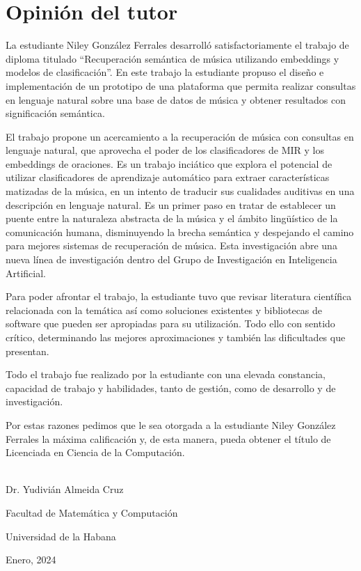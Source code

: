 \chapter*{Opinión del tutor}
\small
La estudiante Niley González Ferrales desarrolló satisfactoriamente el trabajo de diploma titulado “Recuperación semántica de música utilizando embeddings y modelos de clasificación”. En este trabajo la estudiante propuso el diseño e implementación de un prototipo de una plataforma que permita realizar consultas en lenguaje natural sobre una base de datos de música y obtener resultados con significación semántica.

El trabajo propone un acercamiento a la recuperación de música con consultas en lenguaje natural, que aprovecha el poder de los clasificadores de MIR y los embeddings de oraciones. Es un trabajo inciático que explora el potencial de utilizar clasificadores de aprendizaje automático para extraer características matizadas de la música, en un intento de traducir sus cualidades auditivas en una descripción en lenguaje natural. Es un primer paso en tratar de establecer un puente entre la naturaleza abstracta de la música y el ámbito lingüístico de la comunicación humana, disminuyendo la brecha semántica y despejando el camino para mejores sistemas de recuperación de música. Esta investigación abre una nueva línea de investigación dentro del Grupo de Investigación en Inteligencia Artificial.

Para poder afrontar el trabajo, la estudiante tuvo que revisar literatura científica relacionada con la temática así como soluciones existentes y bibliotecas de software que pueden ser apropiadas para su utilización. Todo ello con sentido crítico, determinando las mejores aproximaciones y también las dificultades que presentan.

Todo el trabajo fue realizado por la estudiante con una elevada constancia, capacidad de trabajo y habilidades, tanto de gestión, como de desarrollo y de investigación. 

Por estas razones pedimos que le sea otorgada a la estudiante Niley González Ferrales la máxima calificación y, de esta manera, pueda obtener el título de Licenciada en Ciencia de la Computación.

 \begin{flushright}
   \underline{\hspace{6.5cm}}\\
   Dr. Yudivián Almeida Cruz
   
   Facultad de Matemática y Computación
   
   Universidad de la Habana
   
   Enero, 2024
 \end{flushright}

\normalsize